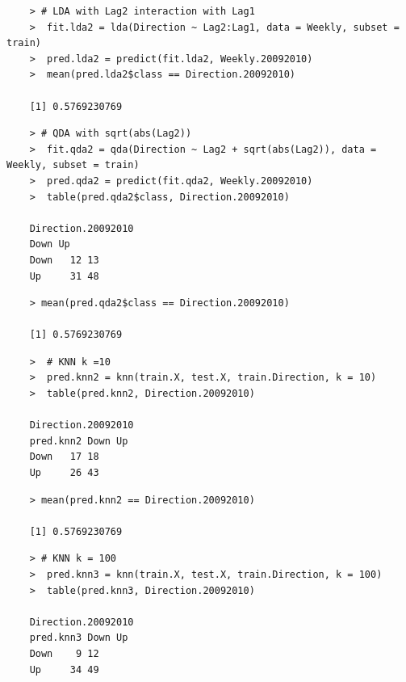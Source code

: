 \documentclass{article}
\begin{document}
\begin{program}
	\begin{verbatim}
	> # LDA with Lag2 interaction with Lag1
	>  fit.lda2 = lda(Direction ~ Lag2:Lag1, data = Weekly, subset = train)
	>  pred.lda2 = predict(fit.lda2, Weekly.20092010)
	>  mean(pred.lda2$class == Direction.20092010)
	
	[1] 0.5769230769
	\end{verbatim}
\end{program}

\newpage
\begin{program}
	\begin{verbatim}
	> # QDA with sqrt(abs(Lag2))
	>  fit.qda2 = qda(Direction ~ Lag2 + sqrt(abs(Lag2)), data = Weekly, subset = train)
	>  pred.qda2 = predict(fit.qda2, Weekly.20092010)
	>  table(pred.qda2$class, Direction.20092010)
	
	Direction.20092010
	Down Up
	Down   12 13
	Up     31 48
	\end{verbatim}
\end{program}

\begin{program}
	\begin{verbatim}
	> mean(pred.qda2$class == Direction.20092010)

	[1] 0.5769230769
	\end{verbatim}
\end{program}

\begin{program}
	\begin{verbatim}
	>  # KNN k =10
	>  pred.knn2 = knn(train.X, test.X, train.Direction, k = 10)
	>  table(pred.knn2, Direction.20092010)
	
	Direction.20092010
	pred.knn2 Down Up
	Down   17 18
	Up     26 43
	\end{verbatim}
\end{program}


\newpage

\begin{program}
	\begin{verbatim}
	> mean(pred.knn2 == Direction.20092010)

	[1] 0.5769230769
		\end{verbatim}
\end{program}

\begin{program}
	\begin{verbatim}
	> # KNN k = 100
	>  pred.knn3 = knn(train.X, test.X, train.Direction, k = 100)
	>  table(pred.knn3, Direction.20092010)
	
	Direction.20092010
	pred.knn3 Down Up
	Down    9 12
	Up     34 49
	\end{verbatim}
\end{program}
\end{document}
